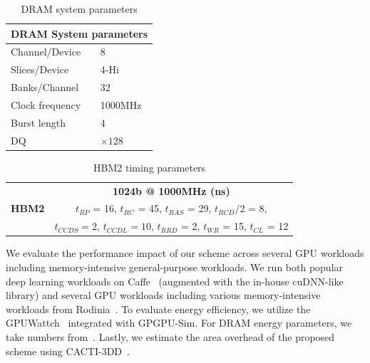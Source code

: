 \def\arraystretch{1.2}
\begin{table}[!t]
\centering
\footnotesize
\begin{tabular}{|l|l|}
  \hline
  \multicolumn{2}{|c|}{\textbf{DRAM System parameters}} \\ \hline
    Channel/Device  & 8 \\ \hline
    Slices/Device   & 4-Hi \\ \hline
    Banks/Channel   & 32 \\ \hline
    Clock frequency & 1000MHz \\ \hline
    Burst length    & 4 \\ \hline
    DQ              & $\times128$  \\ \hline
\end{tabular}
\caption{DRAM system parameters}
\label{tab:metho:DRAMparam}
\end{table}

\def\arraystretch{1.2}
\begin{table}[!t]
\footnotesize
\centering
\begin{tabular}{|c|c|}
  \hline
	\multirow{3}{*}{\textbf{HBM2}} & {\textbf{1024b @ 1000MHz (ns)}}  \\ \cline{2-2}
		& {$t_{RP}$ = 16, $t_{RC}$ = 45, $t_{RAS}$ = 29, $t_{RCD}/2$ = 8,} \\
		& {$t_{CCDS} = 2$, $t_{CCDL} = 10$, $t_{RRD}$ = 2, $t_{WR}$ = 15, $t_{CL}$ = 12} \\ \hline
\end{tabular}
\caption{HBM2 timing parameters}
\label{tab:metho:HBM2param}
\end{table}

We evaluate the performance impact of our scheme across several GPU workloads 
including memory-intensive general-purpose workloads.
We run both popular deep learning workloads on Caffe~ 
(augmented with the in-house cuDNN-like library) 
and several GPU workloads including various memory-intensive workloads from Rodinia~.
To evaluate energy efficiency, we utilize the GPUWattch~ integrated with GPGPU-Sim. 
For DRAM energy parameters, we take numbers from~. 
Lastly, we estimate the area overhead of the proposed scheme using CACTI-3DD~.

\newpage
